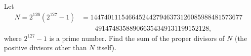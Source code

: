 Let
\[\begin{aligned}N=2^{126}\left(2^{127}-1\right)&=14474011154664524427946373126085988481573677\\&\qquad491474835889066354349131199152128,\end{aligned}\]
where $2^{127}-1$ is a prime number. Find the sum of the proper divisors of $N$ (the positive divisors other than $N$ itself).
